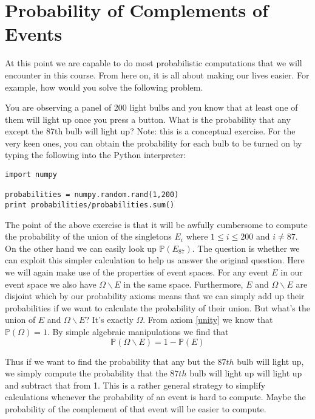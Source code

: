 \section{Probability of Complements of Events}
At this point we are capable to do most probabilistic computations that we will encounter in this course.
From here on, it is all about making our lives easier. For example, how would you solve the following 
problem.

\begin{Exercise}
You are observing a panel of 200 light bulbs and you know that at least one of them will light up once you 
press a button. What is the probability that any except the 87th bulb will light up? Note: this is a 
conceptual exercise. For the very keen ones, you can obtain the probability for each bulb to be turned on
by typing the following into the Python interpreter:

\begin{lstlisting}
import numpy

probabilities = numpy.random.rand(1,200)
print probabilities/probabilities.sum()
\end{lstlisting} 
\end{Exercise}

The point of the above exercise is that it will be awfully cumbersome to compute the probability of the
union of the singletons $ {E_{i}} $ where $ 1 \leq i \leq 200 $ and $ i \not = 87 $. On the other hand
we can easily look up $ \mathbb{P}(E_{87}) $. The question is whether we can exploit this simpler calculation
to help us answer the original question. Here we will again make use of the properties of event spaces.
For any event $ E $ in our event space we also have $ \Omega \backslash E $ in the same space. Furthermore,
$ E $ and $ \Omega \backslash E $ are disjoint which by our probability axioms means that we can simply add
up their probabilities if we want to calculate the probability of their union. But what's the union
of $ E $ and $ \Omega \backslash E $? It's exactly $ \Omega $. From axiom \ref{unity} we know that 
$ \mathbb{P}(\Omega) = 1 $. By simple algebraic manipulations we find that 
\begin{equation}
\mathbb{P}(\Omega \backslash E) = 1 - \mathbb{P}(E)
\end{equation}

Thus if we want to find the probability that any but the $ 87th $ bulb will light up, we simply compute
the probability that the $ 87th $ bulb will light up will light up and subtract that from 1. This is a rather 
general strategy to simplify calculations whenever the probability of an event is hard to compute. 
Maybe the probability of the complement of that event will be easier to compute.

